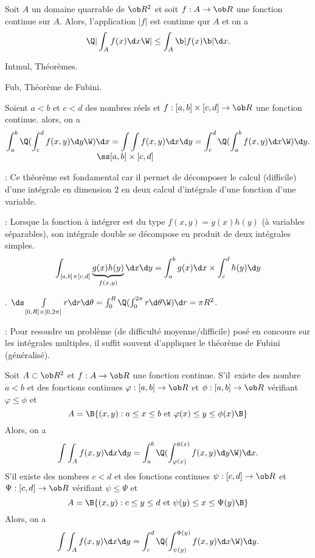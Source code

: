 \Propriete[Title=Valeur absolue]Soit $A$ un domaine quarrable de $\ob R^2$ et soit $f: A\to\ob R$ une fonction continue sur $A$. Alors, 
l'application $|f|$ est continue qur $A$ et on a 
$$
\Q|\int_Af(x)\d x\W|\le \int_A\b|f(x)\b|\d x.
$$

\Section Intmul, Th\'eor\`emes. 

\Subsection Fub, Th\'eor\`eme de Fubini. 

\Theoreme [Title=Th\'eor\`eme de Fubini]
Soient $a< b$ et $c<d$ des nombres r\'eels et $f:[a,b]\times[c,d]\to\ob R$ une fonction continue. alors, on a 
$$
\int_a^b\Q(\int_c^df(x,y)\d y\W)\d x=\int\int\limits_{\llap{$\ss[a,b]\times[c,d]$}}f(x,y)\d x\d y=\int_c^d\Q(\int_a^bf(x,y)\d x\W)\d y.
$$

 : Ce th\'eor\`eme est fondamental car il permet de d\'ecomposer le calcul (difficile) d'une int\'egrale en dimension $2$ en deux calcul d'int\'egrale d'une fonction d'une variable. 
\bigskip

 : Lorsque la fonction \`a int\'egrer est du type $f(x,y)=g(x)h(y)$ (\`a variables s\'eparables), son int\'egrale double 
se d\'ecompose en produit de deux int\'egrales simples. 
$$
\int_{[a,b]\times[c,d]}\underbrace{g(x)h(y)}_{f(x,y)}\d x\d y=\int_a^bg(x)\d x\times\int_c^dh(y)\d y
$$

\Exemple. $\ds\int\limits_{[0,R]\times[0,2\pi]}r\d r\d\theta=\int_0^R\Q(\int_0^{2\pi}r\d\theta\W)\d r=\pi R^2$. 
\bigskip


 : Pour resoudre un probl\`eme (de difficult\'e moyenne/difficile) pos\'e en concours sur les int\'egrales multiples, il suffit souvent d'appliquer le th\'eor\`eme de Fubini (g\'en\'eralis\'e). 
\bigskip


\Theoreme [Index=Theoreme@Th\'eor\`eme!de Fubini;Title=Th\'eor\`eme de Fubini {\it g\'en\'eralis\'e}]
Soit $A\subset \ob R^2$ et $f:A\to\ob R$ une fonction continue. S'il~existe 
des nombre $a< b$ et des fonctions continues $\varphi:[a,b]\to\ob R$ et $\phi:[a,b]\to\ob R$ v\'erifiant $\varphi\le \phi$ et 
$$
A=\B\{(x,y):a\le x\le b\mbox{ et }\varphi(x)\le y\le \phi(x)\B\}
$$
Alors, on a 
$$
\int\int_Af(x,y)\d x\d y=\int_a^b\Q(\int_{\varphi(x)}^{\phi(x)}f(x,y)\d y\W)\d x.
$$
S'il existe 
des nombres $c<d$ et des fonctions continues $\psi:[c,d]\to\ob R$ et $\Psi:[c,d]\to\ob R$ v\'erifiant $\psi\le\Psi$ et 
$$
A=\B\{(x,y):c\le y\le d\mbox{ et }\psi(y)\le x\le \Psi(y)\B\}
$$
Alors, on a 
$$
\int\int_Af(x,y)\d x\d y=\int_c^d\Q(\int_{\psi(y)}^{\Phi(y)}f(x,y)\d x\W)\d y.
$$
\bigskip


